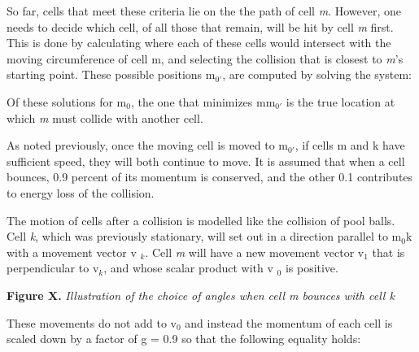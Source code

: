 \documentclass[11.5pt]{article}
\begin{document}
So far, cells that meet these criteria lie on the the path of cell 
{\itshape m}. However, one needs to decide which cell, of all those 
that remain, will be hit by cell {\itshape m} first. This is done by 
calculating where each of these cells would intersect with the moving 
circumference of cell m, and selecting the collision that is closest to 
{\itshape m}'s starting point. These possible positions m$_{0'}$, 
are computed by solving the system:

\begin{figure}[H]
\centering
\end{figure}


Of these solutions for m$_{0}$, the one that minimizes mm$_{0'}$ 
is the true location at which {\itshape m} must collide with another 
cell. 



As noted previously, once the moving cell is moved to m$_{0'}$, if 
cells m and k have sufficient speed, they will both continue to move. It 
is assumed that when a cell bounces, 0.9 percent of its momentum is 
conserved, and the other 0.1 contributes to energy loss of the 
collision. 



The motion of cells after a collision is modelled like the collision of 
pool balls. Cell {\itshape k}, which was previously stationary, will 
set out in a direction parallel to m$_{0}$k with a movement vector v
$_{k}$. Cell {\itshape m} will have a new movement vector v$_{1}$ 
that is perpendicular to v$_{k}$, and whose scalar product with v
$_{0}$ is positive.



\begin{figure}[H]
\centering
\end{figure}


{\bfseries Figure X. }{\itshape Illustration of the choice of angles when 
cell m bounces with cell k}



These movements do not add to v$_{0}$ and instead the momentum of 
each cell is scaled down by a factor of g = 0.9 so that the following 
equality holds:

\begin{figure}[H]
\centering
\end{figure}
\end{document}
